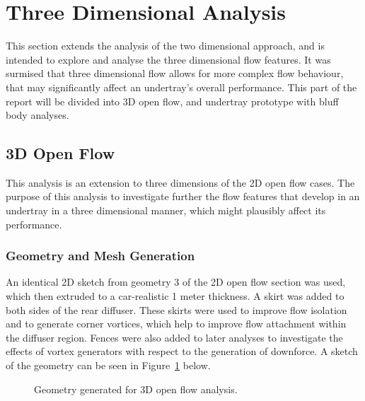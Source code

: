 \section{Three Dimensional Analysis}
\noindent This section extends the analysis of the two dimensional approach, and is intended to explore and analyse the  three dimensional flow features. It was surmised that three dimensional flow allows for more complex flow behaviour, that may significantly affect an undertray's overall performance. This part of the report will be divided into 3D open flow, and undertray prototype with bluff body analyses.

\subsection{3D Open Flow}
This analysis is an extension to three dimensions of the 2D open flow cases. The purpose of this analysis to investigate further the flow features that develop in an undertray in a three dimensional manner, which might plausibly affect its performance.

\subsubsection{Geometry and Mesh Generation}
An identical 2D sketch from geometry 3 of the 2D open flow section was used, which then extruded to a car-realistic 1 meter thickness. A skirt was added to both sides of the rear diffuser. These skirts were used to improve flow isolation and to generate corner vortices, which help to improve flow attachment within the diffuser region. Fences were also added to later analyses to investigate the effects of vortex generators with respect to the generation of downforce. A sketch of the geometry can be seen in Figure~\ref{fig:3D_OF_GEOM} below. 

\begin{figure}[!h]
    \centering
    \noindent{}
    \caption{Geometry generated for 3D open flow analysis.}
    \label{fig:3D_OF_GEOM}
\end{figure}

